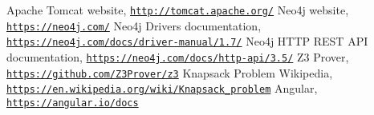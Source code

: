 \begin{thebibliography}{1}
  Apache Tomcat website, \texttt{\url{http://tomcat.apache.org/}}
  Neo4j website, \texttt{\url{https://neo4j.com/}}
  Neo4j Drivers documentation, \texttt{\url{https://neo4j.com/docs/driver-manual/1.7/}}
  Neo4j HTTP REST API documentation, \texttt{\url{https://neo4j.com/docs/http-api/3.5/}}
  Z3 Prover, \texttt{\url{https://github.com/Z3Prover/z3}}
  Knapsack Problem Wikipedia, \texttt{\url{https://en.wikipedia.org/wiki/Knapsack_problem}}
Angular, \texttt{\url{https://angular.io/docs}}  
\end{thebibliography}
